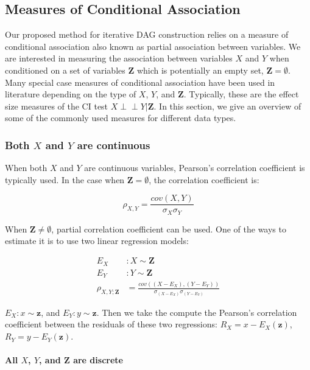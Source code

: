 \documentclass{uai2025} %
\def\ci{\perp\!\!\!\!\!\perp}
\begin{document}
\subsection{Measures of Conditional Association}
Our proposed method for iterative DAG construction relies on a measure of
conditional association also known as partial association between variables. We
are interested in measuring the association between variables $ X $ and $ Y $
when conditioned on a set of variables $ \bm{Z} $ which is potentially an empty
set, $ \bm{Z} = \emptyset $. Many special case measures of conditional
association have been used in literature depending on the type of $ X $, $ Y $,
and $ \bm{Z} $. Typically, these are the effect size measures of the CI test $
X \ci Y \rvert \bm{Z} $. In this section, we give an overview of some of the
commonly used measures for different data types.


\subsubsection{Both $ X $ and $ Y $ are continuous}
When both $ X $ and $ Y $ are continuous variables, Pearson's correlation
coefficient is typically used.  In the case when $ \bm{Z} = \emptyset $, the
correlation coefficient is:

$$ \rho_{X, Y} = \frac{cov(X, Y)}{\sigma_X \sigma_Y} $$


When $ \bm{Z} \neq \emptyset $, partial correlation coefficient can be used. 
One of the ways to estimate it is to use two linear regression models: 

\begin{equation}
	\begin{split}
		E_X &: X \sim \bm{Z} \\
		E_Y &: Y \sim \bm{Z} \\
		\rho_{X, Y; \bm{Z}} &= \frac{cov((X - E_X), (Y - E_Y))}{\sigma_{(X - E_X)} \sigma_{(Y-E_Y)}}
	\end{split}
\end{equation}

$ E_X: x \sim \bm{z} $,
and $ E_Y: y \sim \bm{z} $. Then we take the compute the Pearson's correlation
coefficient between the residuals of these two regressions: $ R_X = x -
E_X(\bm{z}) $, $ R_Y = y - E_Y(\bm{z}) $.

\paragraph{All $ X $, $ Y $, and $ \bm{Z} $ are discrete}
\end{document}
